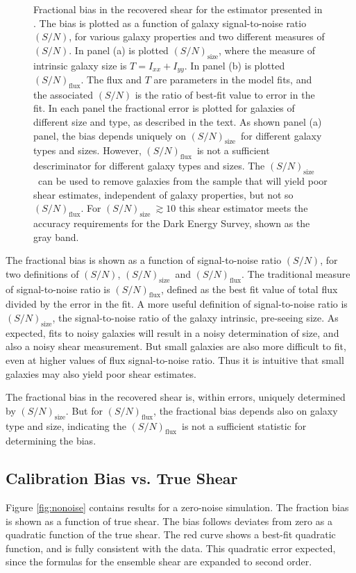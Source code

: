 \documentclass[12pt,preprint]{aastex}
\newcommand{\Tsn}{$(S/N)_{\textrm{size}}$}
\newcommand{\fsn}{$(S/N)_{\textrm{flux}}$}
\begin{document}
\begin{figure}[p]
 \caption{ Fractional bias in the recovered shear for the estimator presented
     in \cite{ba14}.  The bias is plotted as a
     function of galaxy signal-to-noise ratio $(S/N)$, for various galaxy
     properties and two different measures of $(S/N)$.  In panel (a) is
     plotted \Tsn, where the measure of intrinsic galaxy size is $T=I_{xx} + I_{yy}$.  In 
     panel (b) is plotted \fsn.  The flux and $T$ are parameters in the model
     fits, and the associated $(S/N)$ is the ratio of best-fit value to error in
     the fit.  In each panel the fractional error is plotted for galaxies of
     different size and type, as described in the text.  As shown panel (a)
     panel, the bias depends uniquely on \Tsn\ for different galaxy types and
     sizes.  However, \fsn\ is not a sufficient descriminator for different
     galaxy types and sizes.  The \Tsn\ can be used to remove galaxies from the
     sample that will yield poor shear estimates, independent of galaxy
     properties, but not so \fsn.  For \Tsn$~ \gtrsim 10$ this shear estimator meets
 the accuracy requirements for the Dark Energy Survey, shown as the gray band.
 \label{fig:fracerr}}

\end{figure}

The fractional bias is shown as a function of signal-to-noise ratio $(S/N)$,
for two definitions of $(S/N)$, \Tsn\ and \fsn.  The traditional measure of
signal-to-noise ratio is \fsn, defined as the best fit value of total flux
divided by the error in the fit.  A more useful definition of signal-to-noise
ratio is \Tsn, the signal-to-noise ratio of the galaxy intrinsic, pre-seeing
size.  As expected, fits to noisy galaxies will result in a noisy determination
of size, and also a noisy shear measurement. But small galaxies are also more
difficult to fit, even at higher values of flux signal-to-noise ratio.  Thus it
is intuitive that small galaxies may also yield poor shear estimates.

The fractional bias in the recovered shear is, within errors, uniquely
determined by \Tsn.  But for \fsn, the fractional bias depends also on galaxy
type and size, indicating the \fsn\ is not a sufficient statistic for
determining the bias.

\subsection{Calibration Bias vs. True Shear} \label{sec:truebias}

Figure \ref{fig:nonoise} contains results for a zero-noise simulation.  The
fraction bias is shown as a function of true shear.  The bias follows deviates
from zero as a quadratic function of the true shear.  The red curve shows a
best-fit quadratic function, and is fully consistent with the data.  This
quadratic error expected, since the formulas for the ensemble shear are expanded
to second order.
\end{document}
